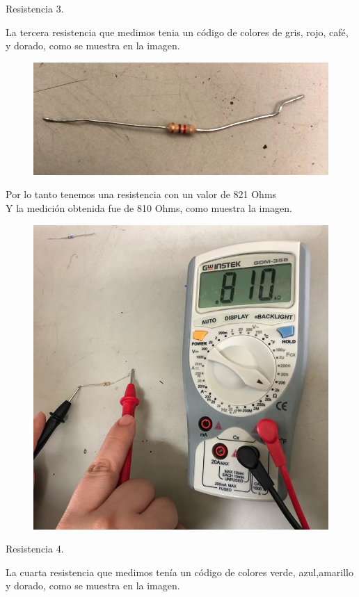 \begin{flushleft}
 		\begin{large}
 		\vspace*{2cm}
 		Resistencia 3.\\
 	\end{large}
 	La tercera resistencia que medimos tenia un c\'odigo de colores de gris, rojo, caf\'e, y dorado, como se muestra en la imagen.\\
 	
 	\begin{figure}[H]
 		\centering
 		\includegraphics[width=0.4\linewidth]{resistencia3}
 		\label{fig:resistencia3}
 	\end{figure}
	\newpage
	\vspace*{2cm}
 	Por lo tanto tenemos una resistencia con un valor de 821 Ohms \\
 	Y la medici\'on obtenida fue de 810 Ohms, como muestra la imagen.\\
 	\begin{figure}[H]
 		\centering
 		\includegraphics[width=0.3\linewidth]{medicion3}
 		\label{fig:medicion3}
 	\end{figure}
 
 	\begin{large}
 	\vspace*{2cm}
 	Resistencia 4.\\
 \end{large}
 La cuarta resistencia que medimos ten\'ia un c\'odigo de colores verde, azul,amarillo y dorado, como se muestra en la imagen.\\
 

\end{flushleft}
